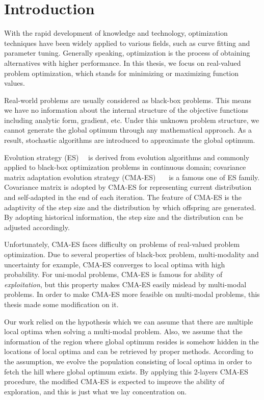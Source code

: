\chapter{Introduction} \label{ch:introduction}

With the rapid development of knowledge and technology, optimization
techniques have been widely applied to various fields, such as curve fitting
and parameter tuning.  Generally speaking, optimization is the process
of obtaining alternatives with higher performance. 
In this thesis, we focus on real-valued problem optimization, which
stands for minimizing or maximizing function values.

Real-world problems are usually considered as black-box problems.
This means we have no information about the internal structure of the
objective functions including analytic form, gradient, etc.
Under this unknown problem structure, we cannot generate the global
optimum through any mathematical approach.
As a result, stochastic algorithms are introduced to approximate the
global optimum.

Evolution strategy (ES)~\cite{Rechenberg:1973}~\cite{Rechenberg:1994} is derived from evolution algorithms and
commonly applied to black-box optimization problems in continuous
domain; covariance matrix adaptation evolution strategy
(CMA-ES)~\cite{Hansen:1996}~\cite{hansen2001ecj}~\cite{hansen2003ecj} is a
famous one of ES family.
Covariance matrix is adopted by CMA-ES for representing current
distribution and self-adapted in the end of each iteration.
The feature of CMA-ES is the adaptivity of the step size and the
distribution by which offspring are generated.
By adopting historical information, the step size and the distribution
can be adjusted accordingly.

Unfortunately, CMA-ES faces difficulty on problems of real-valued
problem optimization.
Due to several properties of black-box problem, multi-modality and
uncertainty for example, CMA-ES converges to local optima with high
probability.
For uni-modal problems, CMA-ES is famous for ability of
\emph{exploitation}, but this property makes CMA-ES easily mislead by
multi-modal problems.
In order to make CMA-ES more feasible on multi-modal problems, this
thesis made some modification on it.

Our work relied on the hypothesis which we can assume that there are
multiple local optima when solving a multi-modal problem.
Also, we assume that the information of the region where global optimum
resides is somehow hidden in the locations of local optima and can be
retrieved by proper methods.
According to the assumption, we evolve the population consisting of
local optima in order to fetch the hill where global optimum exists.
By applying this 2-layers CMA-ES procedure, the modified CMA-ES is
expected to improve the ability of exploration, and this is just what we
lay concentration on.

